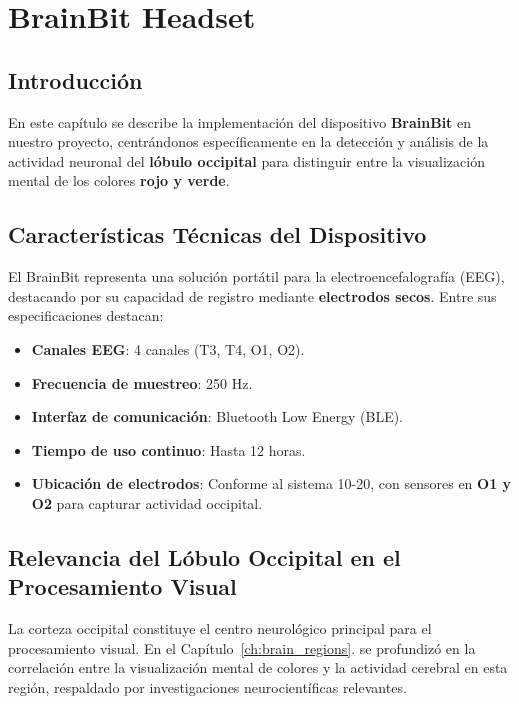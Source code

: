 \chapter{BrainBit Headset}

\section{Introducci\'on}
En este capítulo se describe la implementación del dispositivo \textbf{BrainBit} \cite{brainbit} en nuestro proyecto, centrándonos específicamente en la detección y análisis de la actividad neuronal del \textbf{lóbulo occipital} para distinguir entre la visualización mental de los colores \textbf{rojo y verde}.

\section{Características Técnicas del Dispositivo}
El BrainBit representa una solución portátil para la electroencefalografía (EEG), destacando por su capacidad de registro mediante \textbf{electrodos secos}. Entre sus especificaciones destacan:

    \begin{itemize}
        \item \textbf{Canales EEG}: 4 canales (T3, T4, O1, O2).
        \item \textbf{Frecuencia de muestreo}: 250 Hz.
        \item \textbf{Interfaz de comunicación}: Bluetooth Low Energy (BLE).
        \item \textbf{Tiempo de uso continuo}: Hasta 12 horas.
        \item \textbf{Ubicación de electrodos}: Conforme al sistema 10-20, con sensores en \textbf{O1 y O2} para capturar actividad occipital.
    \end{itemize}

\section{Relevancia del Lóbulo Occipital en el Procesamiento Visual}
La corteza occipital constituye el centro neurológico principal para el procesamiento visual. En el Capítulo~\ref{ch:brain_regions}. se profundizó en la correlación entre la visualización mental de colores y la actividad cerebral en esta región, respaldado por investigaciones neurocientíficas relevantes.

\newpage

